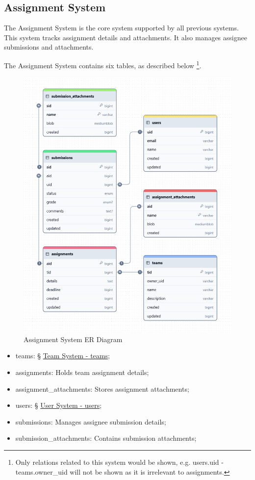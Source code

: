 \documentclass[12pt]{report}
\newcommand{\n}{\par}
\newcommand{\br}{\n\vspace{1 em}\n}
\begin{document}
\subsection{Assignment System} \label{data-layer.design.assignment-system}
The Assignment System is the core system supported by all previous systems.
This system tracks assignment details and attachments.
It also manages assignee submissions and attachments.
\br
The Assignment System contains six tables, as described below
\footnote{Only relations related to this system would be shown,
	e.g. users.uid - teams.owner\_uid will not be shown as it is irrelevant to assignments.}.
\begin{figure}[ht!]
	\centering
	\includegraphics[width=1\linewidth]{assets/data-layer/assignment_system.jpeg}
	\caption{Assignment System ER Diagram}
	\label{fig:assignment-system-er}
\end{figure}
\begin{itemize}
	\item teams: \S{} \hyperref[data-layer.design.team-system.teams]{Team System - teams};
	\item assignments: Holds team assignment details;
	\item assignment\_attachments: Stores assignment attachments;
	\item users: \S{} \hyperref[data-layer.design.user-system.users]{User System - users};
	\item submissions: Manages assignee submission details;
	\item submission\_attachments: Contains submission attachments;
\end{itemize}
\end{document}
